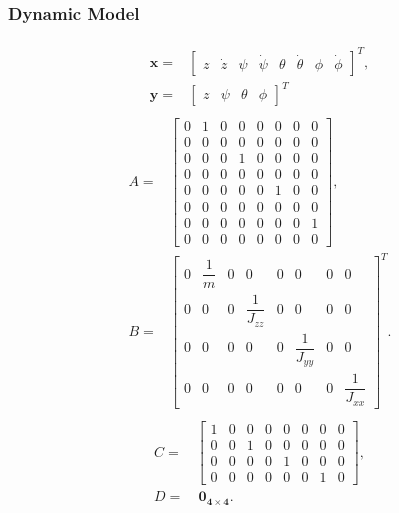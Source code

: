 \subsubsection{Dynamic Model}

\begin{align}
\begin{split}
\mathbf{x} = & \begin{bmatrix}
z & \dot{z} & \psi & \dot{\psi} & \theta & \dot{\theta} & \phi & \dot{\phi}
\end{bmatrix}^{T},\\[15px]
\mathbf{y} = & \begin{bmatrix}
z & \psi & \theta & \phi
\end{bmatrix}^{T}
\end{split}
\end{align}
\begin{align}
\begin{split}
A = & 
\begin{bmatrix}
0 & 1 & 0 & 0 & 0 & 0 & 0 & 0\\[2px]
0 & 0 & 0 & 0 & 0 & 0 & 0 & 0\\[2px]
0 & 0 & 0 & 1 & 0 & 0 & 0 & 0\\[2px]
0 & 0 & 0 & 0 & 0 & 0 & 0 & 0\\[2px]
0 & 0 & 0 & 0 & 0 & 1 & 0 & 0\\[2px]
0 & 0 & 0 & 0 & 0 & 0 & 0 & 0\\[2px]
0 & 0 & 0 & 0 & 0 & 0 & 0 & 1\\[2px]
0 & 0 & 0 & 0 & 0 & 0 & 0 & 0
\end{bmatrix}, \\[15px]
B = & 
\begin{bmatrix}
0 & \dfrac{1}{m} & 0 & 0 & 0 & 0 & 0 & 0\\[5px]
0 & 0 & 0 & \dfrac{1}{J_{zz}} & 0 & 0 & 0 & 0\\[5px]
0 & 0 & 0 & 0 & 0 & \dfrac{1}{J_{yy}} & 0 & 0\\[5px]
0 & 0 & 0 & 0 & 0 & 0 & 0 & \dfrac{1}{J_{xx}}
\end{bmatrix}^{T}.
\end{split}
\end{align}
\begin{align}
\begin{split}
C = & 
\begin{bmatrix}
1 & 0 & 0 & 0 & 0 & 0 & 0 & 0 \\[2px]
0 & 0 & 1 & 0 & 0 & 0 & 0 & 0 \\[2px]
0 & 0 & 0 & 0 & 1 & 0 & 0 & 0 \\[2px]
0 & 0 & 0 & 0 & 0 & 0 & 1 & 0 
\end{bmatrix}, \\[15px]
D = &\ \mathbf{0_{4\times 4}}.
\end{split}
\end{align}
